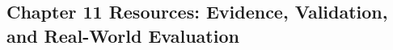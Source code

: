 \begin{refsection}
\chapter{Chapter 11 Resources: Evidence, Validation, and Real-World Evaluation}
\label{chap:comp-ch11}



\printbibliography[heading=subbibliography,title={Chapter 11 References}]
\end{refsection}
